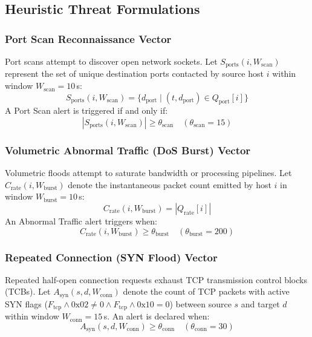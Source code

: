 \documentclass[conference]{IEEEtran}
\begin{document}
\subsection{Heuristic Threat Formulations}

\subsubsection{Port Scan Reconnaissance Vector}
Port scans attempt to discover open network sockets. Let $S_{\text{ports}}(i, W_{\text{scan}})$ represent the set of unique destination ports contacted by source host $i$ within window $W_{\text{scan}} = 10$\,s:
\begin{equation}
S_{\text{ports}}(i, W_{\text{scan}}) = \{ d_{\text{port}} \mid (t, d_{\text{port}}) \in Q_{\text{port}}[i] \}
\end{equation}
A Port Scan alert is triggered if and only if:
\begin{equation}
|S_{\text{ports}}(i, W_{\text{scan}})| \ge \theta_{\text{scan}} \quad (\theta_{\text{scan}} = 15)
\end{equation}

\subsubsection{Volumetric Abnormal Traffic (DoS Burst) Vector}
Volumetric floods attempt to saturate bandwidth or processing pipelines. Let $C_{\text{rate}}(i, W_{\text{burst}})$ denote the instantaneous packet count emitted by host $i$ in window $W_{\text{burst}} = 10$\,s:
\begin{equation}
C_{\text{rate}}(i, W_{\text{burst}}) = |Q_{\text{rate}}[i]|
\end{equation}
An Abnormal Traffic alert triggers when:
\begin{equation}
C_{\text{rate}}(i, W_{\text{burst}}) \ge \theta_{\text{burst}} \quad (\theta_{\text{burst}} = 200)
\end{equation}

\subsubsection{Repeated Connection (SYN Flood) Vector}
Repeated half-open connection requests exhaust TCP transmission control blocks (TCBs). Let $A_{\text{syn}}(s, d, W_{\text{conn}})$ denote the count of TCP packets with active SYN flags ($F_{\text{tcp}} \land \text{0x02} \neq 0 \land F_{\text{tcp}} \land \text{0x10} = 0$) between source $s$ and target $d$ within window $W_{\text{conn}} = 15$\,s. An alert is declared when:
\begin{equation}
A_{\text{syn}}(s, d, W_{\text{conn}}) \ge \theta_{\text{conn}} \quad (\theta_{\text{conn}} = 30)
\end{equation}
\end{document}

